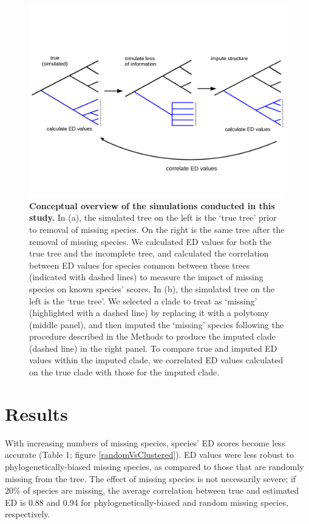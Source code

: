 \documentclass[12pt,english]{article}
\begin{document}
\begin{figure}[!ht]
  \center
  \includegraphics[width=.75\textwidth]{imputeConcept.png}
  \caption{\textbf{Conceptual overview of the simulations conducted in this
  study.} In (a), the simulated tree on the left is the ‘true tree' prior to
  removal of missing species. On the right is the same tree after the removal of
  missing species. We calculated ED values for both the true tree and the
  incomplete tree, and calculated the correlation between ED values for species
  common between these trees (indicated with dashed lines) to measure the impact
  of missing species on known species' scores. In (b), the simulated tree on the
  left is the ‘true tree'. We selected a clade to treat as ‘missing'
  (highlighted with a dashed line) by replacing it with a polytomy (middle
  panel), and then imputed the ‘missing' species following the procedure
  described in the Methods to produce the imputed clade (dashed line) in the
  right panel. To compare true and imputed ED values within the imputed clade,
  we correlated ED values calculated on the true clade with those for the
  imputed clade. }
  \label{imputeConcept}
\end{figure}

\section*{Results}
With increasing numbers of missing species, species' ED scores become less accurate (Table 1;
figure \ref{randomVsClustered}). ED values were less robust to
phylogenetically-biased missing species, as compared to those that are randomly
missing from the tree. The effect of missing species is not necessarily severe;
if 20\% of species are missing, the average correlation
between true and estimated ED is 0.88 and 0.94 for phylogenetically-biased and
random missing species, respectively.
\end{document}
